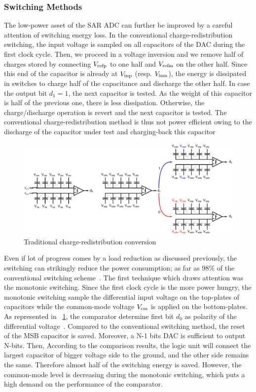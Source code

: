 \subsubsection{Switching Methods}
\label{sec:sar-switching}
The low-power asset of the SAR ADC can further be improved by a careful attention of switching energy loss. In the conventional charge-redistribution switching, the input voltage is sampled on all capacitors of the DAC during the first clock cycle. Then, we proceed in a voltage inversion and we remove half of charges stored by connecting $V_{\rm refp}$ to one half and $V_{\rm refm}$ on the other half. Since this end of the capacitor is already at $V_{\rm inp}$ (resp. $V_{\rm inm}$), the energy is dissipated in switches to charge half of the capacitance and discharge the other half. In case the output bit $d_1 = 1$, the next capacitor is tested. As the weight of this capacitor is half of the previous one, there is less dissipation. Otherwise, the charge/discharge operation is revert and the next capacitor is tested. The conventional charge-redistribution method is thus not power efficient owing to the discharge of the capacitor under test and charging-back this capacitor~\cite{Ginsburg2005}

\begin{figure}[htp]
	\centering
	\includegraphics[width=\textwidth]{Chapter2/Figs/Vector/conv-charge-redis.ps}
	\caption{Traditional charge-redistribution conversion}
	\label{fig:sar_vcm_monotonic}
\end{figure}

Even if lot of progress comes by a load reduction as discussed previously, the switching can strikingly reduce the power consumption; as far as 98\% of the conventional switching scheme~\cite{Zhu2013,Xie2014,Li2016}. The first technique which draws attention was the monotonic switching. Since the first clock cycle is the more power hungry, the monotonic switching sample the differential input voltage on the top-plates of capacitors while the common-mode voltage \(V_{\rm cm}\) is applied on the bottom-plates. As represented in \figurename~\ref{fig:sar_vcm_monotonic}, the comparator determine first bit \(d_0\) as polarity of the differential voltage~\cite{Ginsburg2005}. Compared to the conventional switching method, the reset of the MSB capacitor is saved. Moreover, a N-1 bits DAC is sufficient to output N-bits. Then, According to the comparison results, the logic unit will connect the largest capacitor of bigger voltage side to the ground, and the other side remains the same. Therefore almost half of the switching energy is saved. However, the common-mode level is decreasing during the monotonic switching, which puts a high demand on the performance of the comparator.

